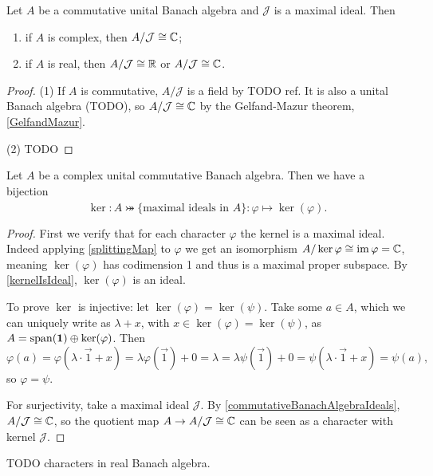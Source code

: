 \begin{lemma} \label{commutativeBanachAlgebraIdeals}
Let $A$ be a commutative unital Banach algebra and $\mathcal{J}$ is a maximal ideal. Then 
\begin{enumerate}
\item if $A$ is complex, then $A/\mathcal{J} \cong \mathbb{C}$;
\item if $A$ is real, then $A/\mathcal{J} \cong \mathbb{R}$ or $A/\mathcal{J} \cong \mathbb{C}$.
\end{enumerate}
\end{lemma}
\begin{proof}
(1) If $A$ is commutative, $A/\mathcal{J}$ is a field by TODO ref. It is also a unital Banach algebra (TODO), so $A/\mathcal{J} \cong \mathbb{C}$ by the Gelfand-Mazur theorem, \ref{GelfandMazur}.

(2) TODO
\end{proof}

\begin{proposition} \label{characterMaximalIdealsComplex}
Let $A$ be a complex unital commutative Banach algebra. Then we have a bijection
\[ \ker: \hat{A} \twoheadrightarrowtail \{\text{maximal ideals in $A$}\}: \varphi \mapsto \ker(\varphi).  \]
\end{proposition}
\begin{proof}
First we verify that for each character $\varphi$ the kernel is a maximal ideal. Indeed applying \ref{splittingMap} to $\varphi$ we get an isomorphism $A/\ker\varphi \cong \operatorname{im}\varphi = \mathbb{C}$, meaning $\ker(\varphi)$ has codimension 1 and thus is a maximal proper subspace. By \ref{kernelIsIdeal}, $\ker(\varphi)$ is an ideal.

To prove $\ker$ is injective: let $\ker(\varphi) = \ker(\psi)$. Take some $a\in A$, which we can uniquely write as $\lambda+x$, with $x\in\ker(\varphi) = \ker(\psi)$, as $A = \operatorname{span}(\boldsymbol{\mathrm{1}})\oplus \ker(\varphi)$. Then
\[ \varphi(a) = \varphi(\lambda\cdot\vec{1} + x) = \lambda\varphi(\vec{1}) + 0 = \lambda = \lambda\psi(\vec{1}) + 0 = \psi(\lambda\cdot\vec{1} + x) = \psi(a), \]
so $\varphi = \psi$.

For surjectivity, take a maximal ideal $\mathcal{J}$.
By \ref{commutativeBanachAlgebraIdeals}, $A/\mathcal{J}\cong \mathbb{C}$, so the quotient map $A\to A/\mathcal{J}\cong \mathbb{C}$ can be seen as a character with kernel $\mathcal{J}$.
\end{proof}

TODO characters in real Banach algebra.


